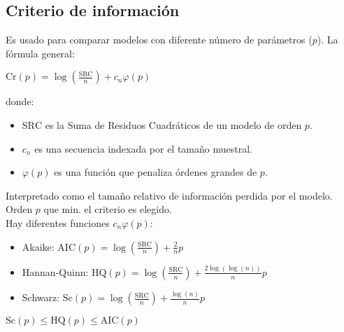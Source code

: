 \documentclass[10pt, a4paper, landscape]{extarticle}
\newcommand{\SRC}{\mathrm{SRC}}
\begin{document}
\begin{multicols}{3}
\section*{Criterio de información}
	Es usado para comparar modelos con diferente número de parámetros ($p$). La fórmula general:
	\begin{center}
		$\mathrm{Cr}(p) = \log(\frac{\SRC}{n}) + c_n \varphi (p)$
	\end{center}
	donde:
	\begin{itemize}[leftmargin=*]
		\item $\SRC$ es la Suma de Residuos Cuadráticos de un modelo de orden $p$.
		\item $c_n$ es una secuencia indexada por el tamaño muestral.
		\item $\varphi(p)$ es una función que penaliza órdenes grandes de $p$.
	\end{itemize}
	Interpretado como el tamaño relativo de información perdida por el modelo. Orden $p$ que min. el criterio es elegido. \\
	Hay diferentes funciones $c_n \varphi(p)$:
	\begin{itemize}[leftmargin=*]
		\item Akaike: $\mathrm{AIC}(p) = \log(\frac{\SRC}{n}) + \frac{2}{n} p$
		\item Hannan-Quinn: $\mathrm{HQ}(p) = \log(\frac{\SRC}{n}) + \frac{2 \log(\log(n))}{n} p$
		\item Schwarz: $\mathrm{Sc}(p) = \log(\frac{\SRC}{n}) + \frac{\log(n)}{n} p$
	\end{itemize}
	$\mathrm{Sc}(p) \leq \mathrm{HQ}(p) \leq \mathrm{AIC}(p)$


\end{multicols}
\end{document}

